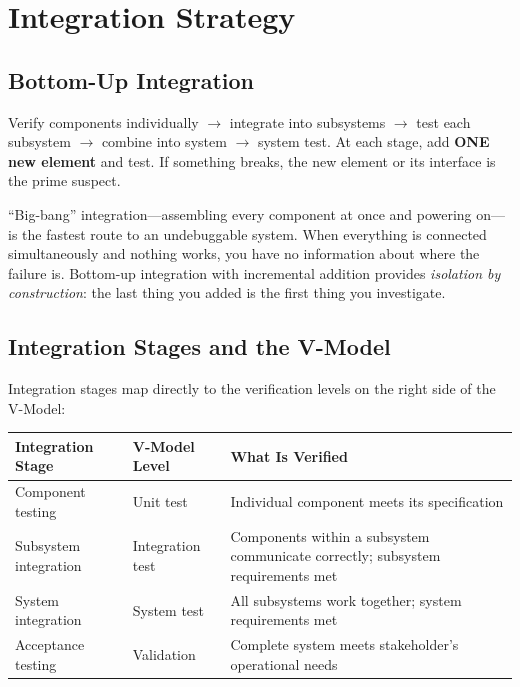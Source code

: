 \documentclass[11pt,letterpaper,twoside,openany]{book}
\begin{document}
\FloatBarrier
\section{Integration Strategy}
\subsection{Bottom-Up Integration}
Verify components individually $\to$ integrate into subsystems $\to$ test each subsystem $\to$ combine into system $\to$ system test. At each stage, add \textbf{ONE new element} and test. If something breaks, the new element or its interface is the prime suspect.

\begin{warningbox}
``Big-bang'' integration---assembling every component at once and powering on---is the fastest route to an undebuggable system. When everything is connected simultaneously and nothing works, you have no information about where the failure is. Bottom-up integration with incremental addition provides \emph{isolation by construction}: the last thing you added is the first thing you investigate.
\end{warningbox}

\subsection{Integration Stages and the V-Model}
Integration stages map directly to the verification levels on the right side of the V-Model:

\begin{center}
\small
\begin{tabularx}{\textwidth}{l X X}
\toprule
\textbf{Integration Stage} & \textbf{V-Model Level} & \textbf{What Is Verified} \\
\midrule
Component testing & Unit test & Individual component meets its specification \\
Subsystem integration & Integration test & Components within a subsystem communicate correctly; subsystem requirements met \\
System integration & System test & All subsystems work together; system requirements met \\
Acceptance testing & Validation & Complete system meets stakeholder's operational needs \\
\bottomrule
\end{tabularx}
\end{center}
\end{document}
